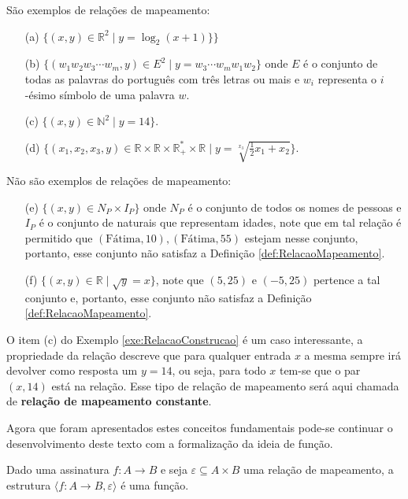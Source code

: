 \begin{example}\label{exe:RelacaoConstrucao}
	São exemplos de relações de mapeamento:
	\begin{itemize}
		\item[(a)] $\{(x, y) \in \mathbb{R}^2 \mid y = \log_2(x + 1)\}\}$
		\item[(b)] $\{(w_1w_2w_3\cdots w_m, y) \in E^2 \mid y = w_3\cdots w_mw_1w_2\}$ onde $E$ é o conjunto de todas as palavras do português com três letras ou mais e $w_i$ representa o $i$-ésimo símbolo de uma palavra $w$.
		\item[(c)] $\{(x, y) \in \mathbb{N}^2 \mid y = 14\}$.
		\item[(d)] $\Big\{(x_1, x_2, x_3, y) \in \mathbb{R} \times \mathbb{R} \times \mathbb{R}^*_+ \times \mathbb{R} \mid y = \sqrt[x_3]{\displaystyle\frac{1}{2}x_1 + x_2}\Big\}$.
	\end{itemize}
	Não são exemplos de relações de mapeamento:
	\begin{itemize}
		\item[(e)] $\{(x, y) \in N_P \times I_P\}$ onde $N_P$ é o conjunto de todos os nomes de pessoas e $I_P$ é o conjunto de naturais que representam idades, note que em tal relação é permitido que $(\text{Fátima}, 10), (\text{Fátima}, 55)$ estejam nesse conjunto, portanto, esse conjunto não satisfaz a Definição \ref{def:RelacaoMapeamento}.
		\item[(f)] $\{(x, y) \in \mathbb{R}  \mid \sqrt{y} = x\}$, note que $(5, 25)$ e $(-5, 25)$ pertence a tal conjunto e, portanto, esse conjunto não satisfaz a Definição \ref{def:RelacaoMapeamento}.
	\end{itemize}
\end{example}

\begin{remark}
	O item (c) do Exemplo \ref{exe:RelacaoConstrucao} é um caso interessante, a propriedade da relação descreve que para qualquer entrada $x$ a mesma sempre irá devolver como resposta um $y = 14$, ou seja, para todo $x$ tem-se que o par $(x, 14)$ está na relação. Esse tipo de relação de mapeamento será aqui chamada de \textbf{relação de mapeamento constante}.    
\end{remark}

Agora que foram apresentados estes conceitos fundamentais pode-se continuar o desenvolvimento deste texto com a formalização da ideia de função.

\begin{definition}[Função]
	Dado uma assinatura $f: A \rightarrow B$ e seja $\varepsilon \subseteq A \times B$ uma relação de mapeamento, a estrutura $\langle f: A \rightarrow B, \varepsilon \rangle$ é uma função.
\end{definition}

